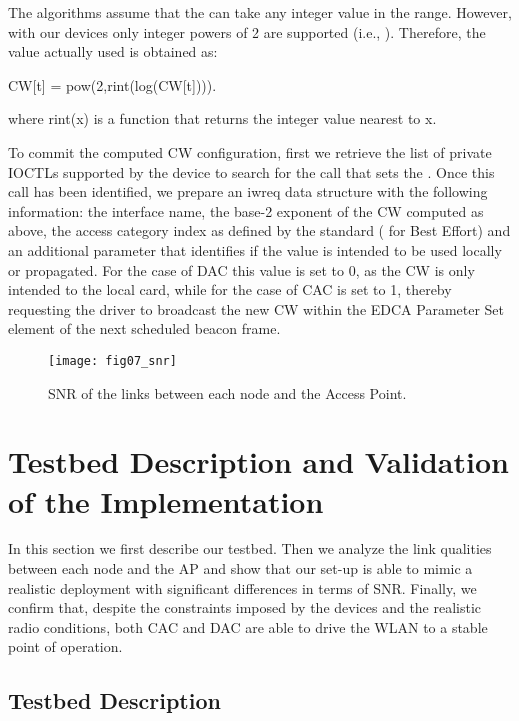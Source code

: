 \documentclass[a4paper,10pt]{article}
\begin{document}
The algorithms assume that the  can take any integer value in the  range. However, with our devices only integer powers of 2 are supported (i.e., ). Therefore, the value actually used is obtained as:
\begin{center}
{\ttfamily CW[t] = pow(2,rint(log(CW[t])))}. 	
\end{center} 
where {\ttfamily rint(x)} is a function that returns the integer value nearest to {\ttfamily x}. 

To commit the computed {\ttfamily CW} configuration, first we retrieve the list of private {\ttfamily IOCTL}s supported by the device to search for the call that sets the . Once this call has been identified, we prepare an {\ttfamily iwreq} data structure with the following information: the interface name, the base-2 exponent of the {\ttfamily CW} computed as above, the access category index as defined by the standard ({} for Best Effort) and an additional parameter that identifies if the value is intended to be used locally or propagated. For the case of DAC this value is set to 0, as the {\ttfamily CW} is only intended to the local card, while for the case of CAC is set to 1, thereby requesting the driver to broadcast the new {\ttfamily CW} within the EDCA Parameter Set element of the next scheduled beacon frame. 

\begin{figure}[t]\texttt{[image: fig07\_snr]}\caption{SNR of the links between each node and the Access Point.}\label{fig:snr}\end{figure}

\section{Testbed Description and Validation of the Implementation}
\label{sec:testbed}

In this section we first describe our testbed. Then we analyze the link qualities between each node and the AP and show that our set-up is able to mimic a realistic deployment with significant differences in terms of SNR. Finally, we confirm that, despite the constraints imposed by the devices and the realistic radio conditions, both CAC and DAC are able to drive the WLAN to a stable point of operation. 

\subsection{Testbed Description}
\end{document}
